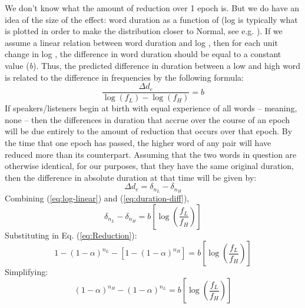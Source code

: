 We don't know what the amount of reduction over 1 epoch is. But we
do have an idea of the size of the  effect: word duration
as a function of  (log  is typically what is plotted
in order to make the  distribution closer to Normal, see
e.g. \citealt{gahl2012reduce}). If we assume a linear relation between
word duration and log , then for each unit change in log
, the difference in word duration should be equal to a constant
value (\emph{b}). Thus, the predicted difference in duration between
a low  and high  word is related to the difference
in frequencies by the following formula: 
\begin{equation}
\frac{\Delta d_{e}}{\log(f_{L})-\log(f_{H})}=b\label{eq:log-linear}
\end{equation}
If speakers/listeners begin at birth with equal experience of all words
– meaning, none – then the differences in duration that accrue over
the course of an epoch will be due entirely to the amount of reduction
that occurs over that epoch. By the time that one epoch has passed,
the higher  word of any pair will have reduced more than
its counterpart. Assuming that the two words in question are otherwise
identical, for our purposes, that they have the same original duration,
then the difference in absolute duration at that time will be given
by:
\begin{equation}
\Delta d_{e}=\delta_{n_{L}}-\delta_{n_{H}}\label{eq:duration-diff}
\end{equation}
Combining (\ref{eq:log-linear}) and (\ref{eq:duration-diff}),
\begin{equation}
\delta_{n_{L}}-\delta_{n_{H}}=b\left[\log\left(\frac{f_{L}}{f_{H}}\right)\right]
\end{equation}
Substituting in Eq. (\ref{eq:Reduction}):
\begin{equation}
1-(1-\alpha)^{n_{L}}-[1-(1-\alpha)^{n_{H}}]=b\left[\log\left(\frac{f_{L}}{f_{H}}\right)\right]
\end{equation}
Simplifying:
\begin{equation}
(1-\alpha)^{n_{H}}-(1-\alpha)^{n_{L}}=b\left[\log\left(\frac{f_{L}}{f_{H}}\right)\right]\label{eq:reduction-to-freq}
\end{equation}


